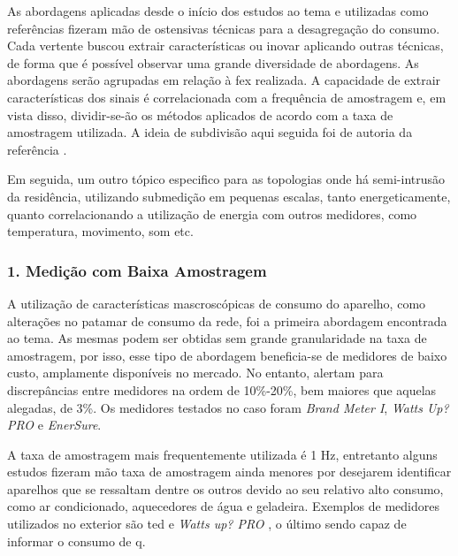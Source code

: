 As abordagens aplicadas desde o início dos estudos ao tema e
utilizadas como referências fizeram mão de ostensivas técnicas para a
desagregação do consumo. Cada vertente buscou extrair características
ou inovar aplicando outras técnicas, de forma que é possível observar
uma grande diversidade de abordagens. As abordagens serão agrupadas em
relação à \gls{fex} realizada. A capacidade de extrair
características dos sinais é correlacionada com a frequência de
amostragem e, em vista disso, dividir-se-ão os métodos aplicados de
acordo com a taxa de amostragem utilizada. A ideia de subdivisão aqui
seguida foi de autoria da referência \cite{nilm_zeifman_review_2011}.

Em seguida, um outro tópico especifico para as topologias onde há
semi-intrusão da residência, utilizando submedição em pequenas
escalas, tanto energeticamente, quanto correlacionando a utilização de
energia com outros medidores, como temperatura, movimento, som etc.

\subsubsection{1. Medição com Baixa Amostragem}
\label{top:nilm_baixa_am}

A utilização de características mascroscópicas de consumo do aparelho,
como alterações no patamar de consumo da rede, foi a
primeira abordagem encontrada ao tema. As mesmas podem ser obtidas sem
grande granularidade na taxa de amostragem, por isso, esse tipo de
abordagem beneficia-se de medidores de baixo custo, amplamente
disponíveis no mercado. No entanto,
\cite{nilm_berges_2008_7,nilm_matthews_overview_2008_22} alertam
para discrepâncias entre medidores na ordem de 10\%-20\%, bem maiores
que aquelas alegadas, de 3\%. Os medidores testados no caso foram
\emph{Brand Meter I}, \emph{Watts Up? PRO} e \emph{EnerSure}.

A taxa de amostragem mais frequentemente utilizada é 1 Hz, entretanto
alguns estudos fizeram mão taxa de amostragem ainda menores por
desejarem identificar aparelhos que se ressaltam dentre os outros
devido ao seu relativo alto consumo, como ar condicionado, aquecedores
de água e geladeira. Exemplos de medidores utilizados no exterior são
\gls{ted} \cite{ted_site} e \emph{Watts up? PRO} \cite{wattsup_site},
o último sendo capaz de informar o consumo de \acl{q}.

